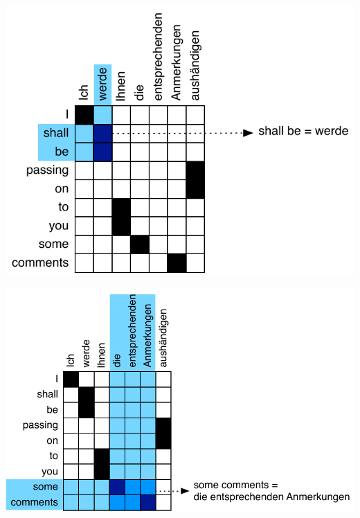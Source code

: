 \documentclass[landscape]{slides}
\begin{document}

\begin{center}
\includegraphics[scale=1.4]{hierarchical-phrase-extraction1.pdf}
\end{center}


\begin{center}
\includegraphics[scale=1.4]{hierarchical-phrase-extraction2.pdf}
\end{center}

\end{document}
